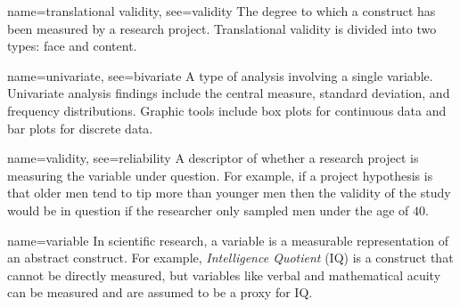 {name={translational validity},
	see={validity}}
{%
	The degree to which a construct has been measured by a research project. Translational validity is divided into two types: face and content.
}

{name={univariate},
	see={bivariate}}
{%
	A type of analysis involving a single variable. Univariate analysis findings include the central measure, standard deviation, and frequency distributions. Graphic tools include box plots for continuous data and bar plots for discrete data.
}

{name={validity},
 see={reliability}}
{%
	A descriptor of whether a research project is measuring the variable under question. For example, if a project hypothesis is that older men tend to tip more than younger men then the validity of the study would be in question if the researcher only sampled men under the age of $ 40 $.
}

{name={variable}}
{%
	In scientific research, a variable is a measurable representation of an abstract construct. For example, \textit{Intelligence Quotient} (IQ) is a construct that cannot be directly measured, but variables like verbal and mathematical acuity can be measured and are assumed to be a proxy for IQ.
}

